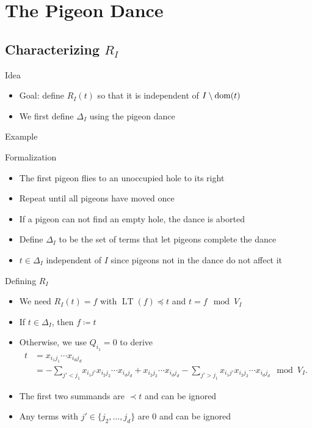 \documentclass[xcolor={dvipsnames}, aspectratio=169, handout]{beamer}
\newcommand{\LT}{\operatorname{LT}}
\begin{document}
\section{The Pigeon Dance}
\subsection{Characterizing \texorpdfstring{$R_I$}{RI}}
\begin{frame}{Idea}
    \begin{itemize}[<+->]
        \item Goal: define $R_I(t)$ so that it is independent of $I \setminus \operatorname{dom}(t)$
        \item We first define $\Delta_I$ using the pigeon dance
    \end{itemize}
\end{frame}

\begin{frame}{Example}
    
\end{frame}

\begin{frame}{Formalization}
    \begin{itemize}[<+->]
        \item The first pigeon flies to an unoccupied hole to its right
        \item Repeat until all pigeons have moved once
        \item If a pigeon can not find an empty hole, the dance is aborted
        \item Define $\Delta_I$ to be the set of terms that let pigeons complete the dance
        \item $t \in \Delta_I$ independent of $I$ since pigeons not in the dance do not affect it
    \end{itemize}
\end{frame}

\begin{frame}{Defining $R_I$}
    \begin{itemize}[<+->]
        \item We need $R_I(t) = f$ with $\LT(f) \preceq t$ and $t = f \mod V_I$
        \item If $t \in \Delta_I$, then $f \coloneqq t$
        \item Otherwise, we use $Q_{i_1} = 0$ to derive
            \begin{align*}
                t &= x_{i_1 j_1} \cdots x_{i_d j_d}\\
                &= - \sum_{j' < j_1} x_{i_1 j'} x_{i_2 j_2} \cdots x_{i_d j_d} + x_{i_2 j_2} \cdots x_{i_d j_d} - \sum_{j' > j_1} x_{i_1 j'} x_{i_2 j_2} \cdots x_{i_d j_d} \mod V_I.
            \end{align*}
        \item The first two summands are $\prec t$ and can be ignored
        \item Any terms with $j' \in \{j_2, \ldots, j_d\}$ are $0$ and can be ignored
    \end{itemize}
\end{frame}
\end{document}
